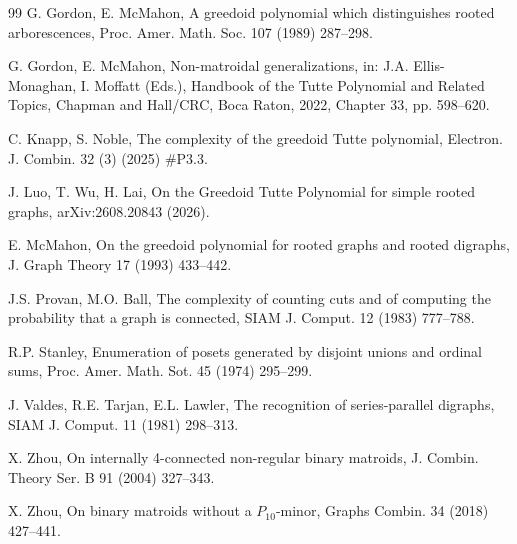 \documentclass[11pt,a4paper]{article}
\begin{document}
\begin{thebibliography}{99}
G. Gordon, E. McMahon, A greedoid polynomial which distinguishes rooted arborescences, Proc. Amer. Math. Soc. 107 (1989) 287--298.

G. Gordon, E. McMahon, Non-matroidal generalizations, in: J.A. Ellis-Monaghan, I. Moffatt (Eds.),
Handbook of the Tutte Polynomial and Related Topics, Chapman and Hall/CRC, Boca Raton, 2022, Chapter 33, pp. 598--620.


C. Knapp, S. Noble, The complexity of the greedoid Tutte polynomial, Electron. J. Combin. 32 (3) (2025) \#P3.3.

J. Luo, T. Wu, H. Lai, On the Greedoid Tutte Polynomial for simple rooted graphs, arXiv:2608.20843 (2026).

E. McMahon, On the greedoid polynomial for rooted graphs and rooted digraphs, J. Graph Theory 17 (1993) 433--442.

J.S. Provan, M.O. Ball, The complexity of counting cuts and of computing the probability that a graph is connected, SIAM J. Comput. 12 (1983) 777--788.

R.P. Stanley, Enumeration of posets generated by disjoint unions and ordinal sums, Proc. Amer. Math. Sot. 45 (1974) 295--299.


J. Valdes, R.E. Tarjan, E.L. Lawler, The recognition of series-parallel digraphs, SIAM J. Comput. 11 (1981) 298--313.

X. Zhou, On internally 4-connected non-regular binary matroids, J. Combin. Theory Ser. B 91 (2004) 327--343.

X. Zhou, On binary matroids without a $P_{10}$-minor, Graphs Combin. 34 (2018) 427--441.

\end{thebibliography}
\end{document}
